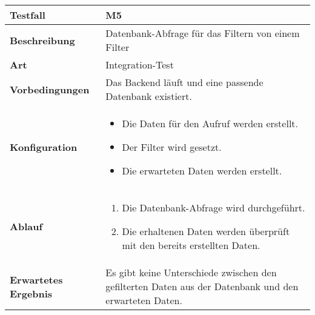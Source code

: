 \begin{longtable}{p{}|p{}}
	\hline
	\textbf{Testfall}               & \textbf{M5} \\
	\hline
	\textbf{Beschreibung}   		& Datenbank-Abfrage für das Filtern von einem Filter \\
	\hline
	\textbf{Art}    				& Integration-Test \\
	\hline
	\textbf{Vorbedingungen}    		& Das Backend läuft und eine passende Datenbank existiert. \\
	\hline
	\textbf{Konfiguration}   	 	& 
	\begin{itemize}
		\item Die Daten für den Aufruf werden erstellt.
		\item Der Filter wird gesetzt.
		\item Die erwarteten Daten werden erstellt.
	\end{itemize} \\
	\hline
	\textbf{Ablauf}    				& 
	\begin{enumerate}
		\item Die Datenbank-Abfrage wird durchgeführt.
		\item Die erhaltenen Daten werden überprüft mit den bereits erstellten Daten.
	\end{enumerate} \\
	\hline
	\textbf{Erwartetes Ergebnis}    & Es gibt keine Unterschiede zwischen den gefilterten Daten aus der Datenbank und den erwarteten Daten. \\
	\hline
\end{longtable}\label{tab:testfall-M5}

